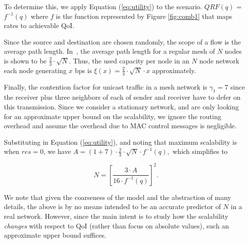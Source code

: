 To determine this, we apply Equation (\ref{eq:utility}) to the scenario.
$QRF(q)$ = $f^{-1}(q)$ where $f$ is the function represented by Figure
\ref{fig:comb1} that maps rates to achievable QoI.

Since the source and destination are chosen randomly, the scope of a flow is
the average path length. In~\cite{Silv83}, the average path length for a
regular mesh of $N$ nodes is shown to be
$\frac{2}{3}\cdot \sqrt{N}$. Thus, the used capacity per node
in an $N$ node network each node generating $x$ bps
is $\xi(x) = \frac{2}{3}\cdot \sqrt{N}\cdot
x$ approximately.

Finally, the contention factor for unicast traffic in a mesh network
is $\gamma_1 = 7$ since the receiver
plus three neighbors of each of sender and receiver
 have to defer on this transmission. Since we
consider a stationary network, and are only looking for an approximate
upper bound on the scalability, we ignore the routing overhead and
assume the overhead due to MAC control messages is negligible.



Substituting  in Equation (\ref{eq:utility}), and noting that maximum
scalability is when $res = 0$, we have
$
A = (1+7)\cdot \frac{2}{3}\cdot  \sqrt{N}\cdot  f^{-1}(q),
$
which simplifies to

\begin{equation}
N = [\frac{3\cdot A}{16\cdot f^{-1}(q)}]^2.
\end{equation}

We note that given the coarseness of the model and the abstraction of many
details, the above is by no means intended to be an accurate predictor of
$N$ in a real network. However, since the main intent is to study how
the scalability {\em changes}
with respect to QoI (rather than focus on absolute values),
such an approximate upper bound suffices.



